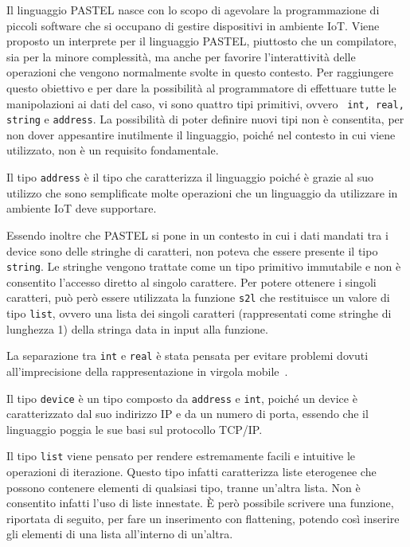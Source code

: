 \documentclass[10pt]{article}
\begin{document}
Il linguaggio PASTEL nasce con lo scopo di agevolare la programmazione di piccoli software che si occupano di gestire dispositivi in ambiente IoT. Viene proposto un interprete per il linguaggio PASTEL, piuttosto che un compilatore, sia per la minore complessità, ma anche per favorire l'interattività delle operazioni che vengono normalmente svolte in questo contesto. Per raggiungere questo obiettivo e per dare la possibilità al programmatore di effettuare tutte le manipolazioni ai dati del caso, vi sono quattro tipi primitivi, ovvero \texttt{ int, real, string} e \texttt{address}. La possibilità di poter definire nuovi tipi non è consentita, per non dover appesantire inutilmente il linguaggio, poiché nel contesto in cui viene utilizzato, non è un requisito fondamentale. 

Il tipo \texttt{address} è il tipo che caratterizza il linguaggio poiché è grazie al suo utilizzo che sono semplificate molte operazioni che un linguaggio da utilizzare in ambiente IoT deve supportare. 

Essendo inoltre che PASTEL si pone in un contesto in cui i dati mandati tra i device sono delle stringhe di caratteri, non poteva che essere presente il tipo \texttt{string}. Le stringhe vengono trattate come un tipo primitivo immutabile e non è consentito l'accesso diretto al singolo carattere. Per potere ottenere i singoli caratteri, può però essere utilizzata la funzione \texttt{s2l} che restituisce un valore di tipo \texttt{list}, ovvero una lista dei singoli caratteri (rappresentati come stringhe di lunghezza 1) della stringa data in input alla funzione. 

La separazione tra \texttt{int} e \texttt{real} è stata pensata per evitare problemi dovuti all'imprecisione della rappresentazione in virgola mobile~\cite{benz2012dynamic}. 

Il tipo \texttt{device} è un tipo composto da \texttt{address} e \texttt{int}, poiché un device è caratterizzato dal suo indirizzo IP e da un numero di porta, essendo che il linguaggio poggia le sue basi sul protocollo TCP/IP. 

Il tipo \texttt{list} viene pensato per rendere estremamente facili e intuitive le operazioni di iterazione. Questo tipo infatti caratterizza liste eterogenee che possono contenere elementi di qualsiasi tipo, tranne un'altra lista. Non è consentito infatti l'uso di liste innestate. È però possibile scrivere una funzione, riportata di seguito, per fare un inserimento con flattening, potendo così inserire gli elementi di una lista all'interno di un'altra. 
\end{document}
